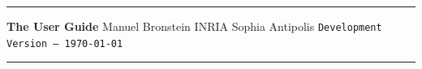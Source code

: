 % 
% 
% 
% 
% 
\thispagestyle{empty}
\begin{center}
\vskip 5cm
\hrule
\vskip 5mm
{\LARGE\bf The \bernina{} User Guide}
\vskip 5mm
{\Large Manuel Bronstein}
\vskip 2mm
{\Large INRIA Sophia Antipolis}
\vskip 2mm
{\Large\tt Development Version -- \today}
\vskip 0.5cm
\hrule
\vskip 2cm
\begin{figure}[ht]
\begin{center}
\end{center}
\end{figure}
\par\noindent
\end{center}
